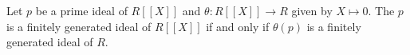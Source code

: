 Let $p$ be a prime ideal of $R[[X]]$ and $\theta\colon R[[X]]\to R$ given by
$X\mapsto 0$. The $p$ is a finitely generated ideal of $R[[X]]$ if and only if
$\theta(p)$ is a finitely generated ideal of $R$.
